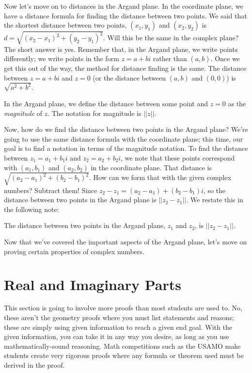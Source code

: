 \documentclass[../book.tex]{subfiles}
\begin{document}
Now let's move on to distances in the Argand plane.  In the coordinate plane, we have a distance formula for finding the distance between two points.  We said that the shortest distance between two points, $(x_1,y_1)$ and $(x_2,y_2)$ is $d=\sqrt{\left(x_2-x_1\right)^2+\left(y_2-y_1\right)^2}$.  Will this be the same in the complex plane?  The short answer is yes.  Remember that, in the Argand plane, we write points differently; we write points in the form $z=a+bi$ rather than $(a,b)$.  Once we get this out of the way, the method for distance finding is the same.  The distance between $z=a+bi$ and $z=0$ (or the distance between $(a,b)$ and $(0,0)$) is $\sqrt{a^2+b^2}$.
\begin{note}
In the Argand plane, we define the distance between some point and $z=0$ as the \textit{magnitude} of $z$.  The notation for magnitude is $||z||$.
\end{note}
Now, how do we find the distance between two points in the Argand plane?  We're going to use the same distance formula with the coordinate plane; this time, our goal is to find a notation in terms of the magnitude notation.  To find the distance between $z_1=a_1+b_1i$ and $z_2=a_2+b_2i$, we note that these points correspond with $\left(a_1,b_1\right)$ and $\left(a_2,b_2\right)$ in the coordinate plane.  That distance is $\sqrt{\left(a_2-a_1\right)^2+\left(b_2-b_1\right)^2}$.  How can we form that with the given complex numbers?  Subtract them!  Since $z_2-z_1=\left(a_2-a_1\right)+\left(b_2-b_1\right)i$, so the distance between two points in the Argand plane is $||z_2-z_1||$.  We restate this in the following note:
\begin{note}
The distance between two points in the Argand plane, $z_1$ and $z_2$, is $||z_2-z_1||$.
\end{note}
\noindent Now that we've covered the important aspects of the Argand plane, let's move on proving certain properties of complex numbers.
\section{Real and Imaginary Parts}
\noindent This section is going to involve more proofs than most students are used to.  No, these aren't the geometry proofs where you must list statements and reasons; these are simply using given information to reach a given end goal.  With the given information, you can take it in any way you desire, as long as you use mathematically-sound reasoning.  Math competitions such as the USAMO make students create very rigorous proofs where any formula or theorem used must be derived in the proof.
\end{document}

